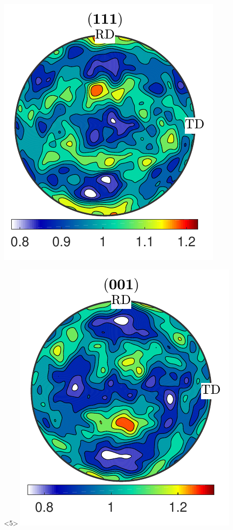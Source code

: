 \documentclass[compress]{beamer}
\begin{document}
\begin{frame}[fragile]
\begin{columns}
\begin{column}{0.29\textwidth}
\begin{onlyenv}
      \includegraphics[width=\textwidth]{pic/rolling111_1}
    \end{onlyenv}

    \begin{onlyenv}<5>
        \includegraphics[width=\textwidth]{pic/rolling001_2}


\end{onlyenv}
\end{column}
\end{columns}
\end{frame}
\end{document}
